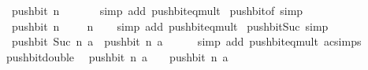 \begin{isabellebody}
\ \ {\isachardoublequoteopen}push{\isacharunderscore}{\kern0pt}bit\ n\ {}\ {\isacharequal}{\kern0pt}\ {}{\isachardoublequoteclose}\isanewline
%
\isadelimproof
\ \ %
\endisadelimproof
%
\isatagproof
{}\isamarkupfalse%
\ {\isacharparenleft}{\kern0pt}simp\ add{\isacharcolon}{\kern0pt}\ push{\isacharunderscore}{\kern0pt}bit{\isacharunderscore}{\kern0pt}eq{\isacharunderscore}{\kern0pt}mult{\isacharparenright}{\kern0pt}%
\endisatagproof
{\isafoldproof}%
%
\isadelimproof
\isanewline
%
\endisadelimproof
\isanewline
{}\isamarkupfalse%
\ push{\isacharunderscore}{\kern0pt}bit{\isacharunderscore}{\kern0pt}of{\isacharunderscore}{\kern0pt}{}\ {\isacharbrackleft}{\kern0pt}simp{\isacharbrackright}{\kern0pt}{\isacharcolon}{\kern0pt}\isanewline
\ \ {\isachardoublequoteopen}push{\isacharunderscore}{\kern0pt}bit\ n\ {}\ {\isacharequal}{\kern0pt}\ {}\ {\isacharcircum}{\kern0pt}\ n{\isachardoublequoteclose}\isanewline
%
\isadelimproof
\ \ %
\endisadelimproof
%
\isatagproof
{}\isamarkupfalse%
\ {\isacharparenleft}{\kern0pt}simp\ add{\isacharcolon}{\kern0pt}\ push{\isacharunderscore}{\kern0pt}bit{\isacharunderscore}{\kern0pt}eq{\isacharunderscore}{\kern0pt}mult{\isacharparenright}{\kern0pt}%
\endisatagproof
{\isafoldproof}%
%
\isadelimproof
\isanewline
%
\endisadelimproof
\isanewline
{}\isamarkupfalse%
\ push{\isacharunderscore}{\kern0pt}bit{\isacharunderscore}{\kern0pt}Suc\ {\isacharbrackleft}{\kern0pt}simp{\isacharbrackright}{\kern0pt}{\isacharcolon}{\kern0pt}\isanewline
\ \ {\isachardoublequoteopen}push{\isacharunderscore}{\kern0pt}bit\ {\isacharparenleft}{\kern0pt}Suc\ n{\isacharparenright}{\kern0pt}\ a\ {\isacharequal}{\kern0pt}\ push{\isacharunderscore}{\kern0pt}bit\ n\ {\isacharparenleft}{\kern0pt}a\ {\isacharasterisk}{\kern0pt}\ {}{\isacharparenright}{\kern0pt}{\isachardoublequoteclose}\isanewline
%
\isadelimproof
\ \ %
\endisadelimproof
%
\isatagproof
{}\isamarkupfalse%
\ {\isacharparenleft}{\kern0pt}simp\ add{\isacharcolon}{\kern0pt}\ push{\isacharunderscore}{\kern0pt}bit{\isacharunderscore}{\kern0pt}eq{\isacharunderscore}{\kern0pt}mult\ ac{\isacharunderscore}{\kern0pt}simps{\isacharparenright}{\kern0pt}%
\endisatagproof
{\isafoldproof}%
%
\isadelimproof
\isanewline
%
\endisadelimproof
\isanewline
{}\isamarkupfalse%
\ push{\isacharunderscore}{\kern0pt}bit{\isacharunderscore}{\kern0pt}double{\isacharcolon}{\kern0pt}\isanewline
\ \ {\isachardoublequoteopen}push{\isacharunderscore}{\kern0pt}bit\ n\ {\isacharparenleft}{\kern0pt}a\ {\isacharasterisk}{\kern0pt}\ {}{\isacharparenright}{\kern0pt}\ {\isacharequal}{\kern0pt}\ push{\isacharunderscore}{\kern0pt}bit\ n\ a\ {\isacharasterisk}{\kern0pt}\ {}{\isachardoublequoteclose}\isanewline

\end{isabellebody}
